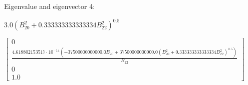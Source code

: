 \documentclass[8pt]{report}
\begin{document}
Eigenvalue and eigenvector 4:

\begin{math}
3.0 \left(B_{20}^{2} + 0.333333333333334 B_{22}^{2}\right)^{0.5}
\end{math}

\begin{math}
\left[\begin{matrix}0\\\frac{4.618802153517 \cdot 10^{-14} \left(- 37500000000000.0 B_{20} + 37500000000000.0 \left(B_{20}^{2} + 0.333333333333334 B_{22}^{2}\right)^{0.5}\right)}{B_{22}}\\0\\1.0\end{matrix}\right]
\end{math}
\end{document}
